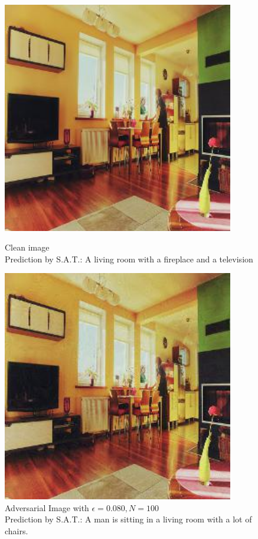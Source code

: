 \begin{figure}[ht]
    \centering
    \begin{minipage}{0.45\textwidth}
        \centering
        \includegraphics[width=0.9\textwidth]{figures/Distract/n=100/samples/0.000/img_0.jpg} %
        \caption*{Clean image\\Prediction by S.A.T.: A living room with a fireplace and a television}
    \end{minipage}\hfill
    \begin{minipage}{0.45\textwidth}
        \centering
        \includegraphics[width=0.9\textwidth]{figures/Distract/n=100/samples/0.080/img_0.jpg} %
        \caption*{Adversarial Image with $\epsilon=0.080, N=100$\\Prediction by S.A.T.: A man is sitting in a living room with a lot of chairs.}
    \end{minipage}
\end{figure}

